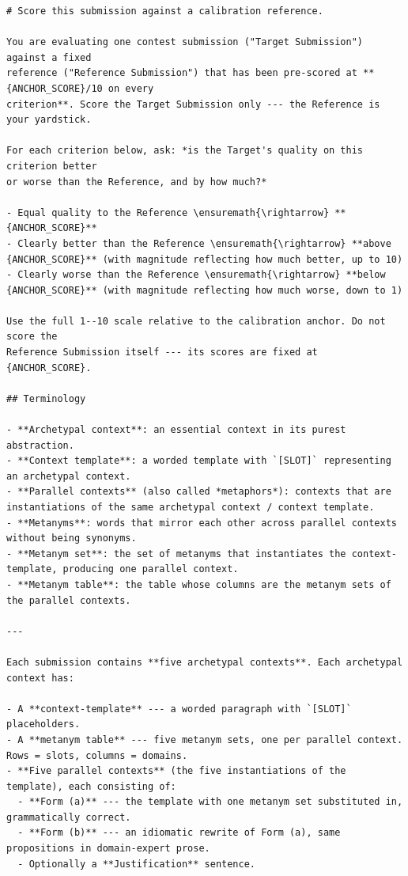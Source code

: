 \documentclass{article}
\begin{document}
\begin{lstlisting}
# Score this submission against a calibration reference.

You are evaluating one contest submission ("Target Submission") against a fixed
reference ("Reference Submission") that has been pre-scored at **{ANCHOR_SCORE}/10 on every
criterion**. Score the Target Submission only --- the Reference is your yardstick.

For each criterion below, ask: *is the Target's quality on this criterion better
or worse than the Reference, and by how much?*

- Equal quality to the Reference \ensuremath{\rightarrow} **{ANCHOR_SCORE}**
- Clearly better than the Reference \ensuremath{\rightarrow} **above {ANCHOR_SCORE}** (with magnitude reflecting how much better, up to 10)
- Clearly worse than the Reference \ensuremath{\rightarrow} **below {ANCHOR_SCORE}** (with magnitude reflecting how much worse, down to 1)

Use the full 1--10 scale relative to the calibration anchor. Do not score the
Reference Submission itself --- its scores are fixed at {ANCHOR_SCORE}.

## Terminology

- **Archetypal context**: an essential context in its purest abstraction.
- **Context template**: a worded template with `[SLOT]` representing an archetypal context.
- **Parallel contexts** (also called *metaphors*): contexts that are instantiations of the same archetypal context / context template.
- **Metanyms**: words that mirror each other across parallel contexts without being synonyms.
- **Metanym set**: the set of metanyms that instantiates the context-template, producing one parallel context.
- **Metanym table**: the table whose columns are the metanym sets of the parallel contexts.

---

Each submission contains **five archetypal contexts**. Each archetypal context has:

- A **context-template** --- a worded paragraph with `[SLOT]` placeholders.
- A **metanym table** --- five metanym sets, one per parallel context. Rows = slots, columns = domains.
- **Five parallel contexts** (the five instantiations of the template), each consisting of:
  - **Form (a)** --- the template with one metanym set substituted in, grammatically correct.
  - **Form (b)** --- an idiomatic rewrite of Form (a), same propositions in domain-expert prose.
  - Optionally a **Justification** sentence.


\end{lstlisting}
\end{document}
